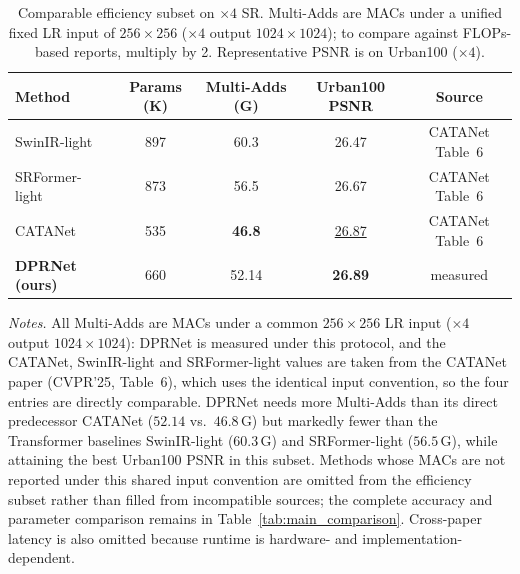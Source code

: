 \begin{table}[H]
\centering
\caption{Comparable efficiency subset on $\times 4$ SR. Multi-Adds are MACs under a unified fixed LR
input of $256\times256$ ($\times4$ output $1024\times1024$); to compare against FLOPs-based reports,
multiply by 2. Representative PSNR is on Urban100 ($\times 4$).}
\label{tab:efficiency}
\begingroup
\scriptsize
\setlength{\tabcolsep}{3pt}
\renewcommand{\arraystretch}{1.05}
\begin{tabular*}{\columnwidth}{@{\extracolsep{\fill}}lcccc}
\toprule
Method & Params (K) & Multi-Adds (G) & Urban100 PSNR & Source \\
\midrule
SwinIR-light    & 897  & 60.3  & 26.47 & CATANet Table~6 \\
SRFormer-light  & 873  & 56.5  & 26.67 & CATANet Table~6 \\
CATANet         & 535  & \textbf{46.8} & \underline{26.87} & CATANet Table~6 \\
\textbf{DPRNet (ours)} & 660 & 52.14 & \textbf{26.89} & measured \\
\bottomrule
\end{tabular*}
\endgroup

\vspace{2pt}
{\footnotesize
\textit{Notes.} All Multi-Adds are MACs under a common $256\times256$ LR input
($\times4$ output $1024\times1024$): DPRNet is measured under this protocol, and the CATANet,
SwinIR-light and SRFormer-light values are taken from the CATANet paper (CVPR'25, Table~6), which uses
the identical input convention, so the four entries are directly comparable. DPRNet
needs more Multi-Adds than its direct predecessor CATANet ($52.14$ vs.\ $46.8$\,G) but markedly fewer
than the Transformer baselines SwinIR-light ($60.3$\,G) and SRFormer-light ($56.5$\,G), while attaining
the best Urban100 PSNR in this subset. Methods whose MACs are not reported under this shared input
convention are omitted from the efficiency subset rather than filled from incompatible sources; the
complete accuracy and parameter comparison remains in Table~\ref{tab:main_comparison}. Cross-paper
latency is also omitted because runtime is hardware- and implementation-dependent.}
\end{table}

